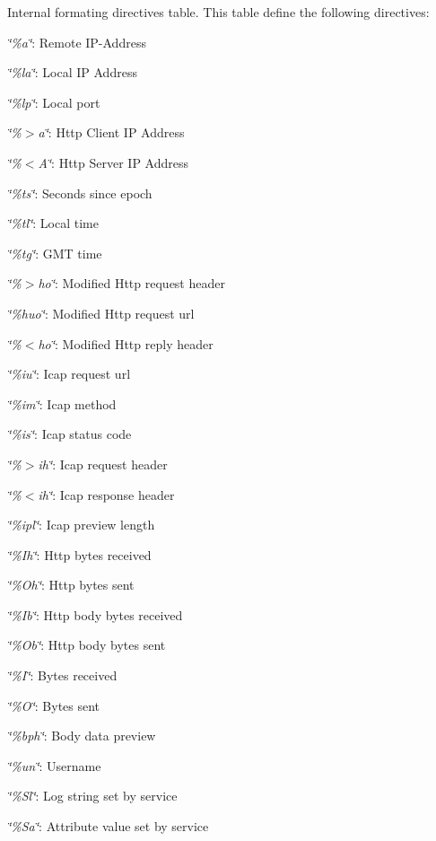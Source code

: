Internal formating directives table. This table define the following directives:\par
 {\itshape \char`\"{}\%a\char`\"{}\/}: Remote IP-\/Address \par
 {\itshape \char`\"{}\%la\char`\"{}\/}: Local IP Address \par
 {\itshape \char`\"{}\%lp\char`\"{}\/}: Local port \par
 {\itshape \char`\"{}\%$>$a\char`\"{}\/}: Http Client IP Address \par
 {\itshape \char`\"{}\%$<$A\char`\"{}\/}: Http Server IP Address \par
 {\itshape \char`\"{}\%ts\char`\"{}\/}: Seconds since epoch \par
 {\itshape \char`\"{}\%tl\char`\"{}\/}: Local time \par
 {\itshape \char`\"{}\%tg\char`\"{}\/}: GMT time \par
 {\itshape \char`\"{}\%$>$ho\char`\"{}\/}: Modified Http request header \par
 {\itshape \char`\"{}\%huo\char`\"{}\/}: Modified Http request url \par
 {\itshape \char`\"{}\%$<$ho\char`\"{}\/}: Modified Http reply header \par
 {\itshape \char`\"{}\%iu\char`\"{}\/}: Icap request url \par
 {\itshape \char`\"{}\%im\char`\"{}\/}: Icap method \par
 {\itshape \char`\"{}\%is\char`\"{}\/}: Icap status code \par
 {\itshape \char`\"{}\%$>$ih\char`\"{}\/}: Icap request header \par
 {\itshape \char`\"{}\%$<$ih\char`\"{}\/}: Icap response header \par
 {\itshape \char`\"{}\%ipl\char`\"{}\/}: Icap preview length \par
 {\itshape \char`\"{}\%Ih\char`\"{}\/}: Http bytes received \par
 {\itshape \char`\"{}\%Oh\char`\"{}\/}: Http bytes sent \par
 {\itshape \char`\"{}\%Ib\char`\"{}\/}: Http body bytes received \par
 {\itshape \char`\"{}\%Ob\char`\"{}\/}: Http body bytes sent \par
 {\itshape \char`\"{}\%I\char`\"{}\/}: Bytes received \par
 {\itshape \char`\"{}\%O\char`\"{}\/}: Bytes sent \par
 {\itshape \char`\"{}\%bph\char`\"{}\/}: Body data preview \par
 {\itshape \char`\"{}\%un\char`\"{}\/}: Username \par
 {\itshape \char`\"{}\%Sl\char`\"{}\/}: Log string set by service\par
 {\itshape \char`\"{}\%Sa\char`\"{}\/}: Attribute value set by service\par


